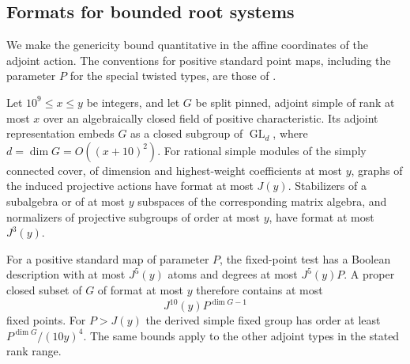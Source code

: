 \subsection{Formats for bounded root systems}

We make the genericity bound quantitative in the affine coordinates of the
adjoint action.  The conventions for positive standard point maps, including
the parameter $P$ for the special twisted types, are those of
.

\begin{lemma}\label{q:root-formats}
Let $10^9\le x\le y$ be integers, and let $G$ be split pinned, adjoint
simple of rank at most $x$ over an algebraically closed field of positive
characteristic.  Its adjoint representation embeds $G$ as a closed subgroup
of $\operatorname{GL}_d$, where $d=\dim G=O((x+10)^2)$.
For rational simple modules of the simply connected cover, of dimension
and highest-weight coefficients at most $y$, graphs of the induced
projective actions have format at most $J(y)$.  Stabilizers of a subalgebra
or of at most $y$ subspaces of the
corresponding matrix algebra, and normalizers of projective subgroups of
order at most $y$, have format at most $J^3(y)$.

For a positive standard map of parameter $P$, the fixed-point test has a
Boolean description with at most $J^5(y)$ atoms and degrees at most
$J^5(y)P$.  A proper closed subset of $G$ of format at most $y$ therefore
contains at most
\begin{equation}\label{q:proper-fixed-count}
                 J^{10}(y)P^{\dim G-1}
\end{equation}
fixed points.  For $P>J(y)$ the derived simple fixed group has order at least
$P^{\dim G}/(10y)^4$.  The same bounds apply to the other adjoint types in
the stated rank range.
\end{lemma}

